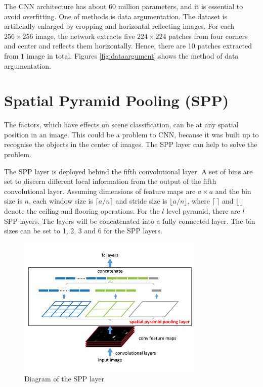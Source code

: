 The CNN architecture \citep{krizhevsky2012imagenet} has about 60 million parameters, and it is essential to avoid overfitting. One of methods is data argumentation. The dataset is artificially enlarged by cropping and horizontal reflecting images. For each $256\times256$ image, the network extracts five $224\times224$ patches from four corners and center and reflects them horizontally. Hence, there are 10 patches extracted from $1$ image in total. Figures \ref{fig:dataargument} shows the method of data argumentation.

\section{Spatial Pyramid Pooling (SPP)}

The factors, which have effects on scene classification, can be at any spatial position in an image. This could be a problem to CNN, because it was built up to recognise the objects in the center of images. The SPP layer can help to solve the problem.

The SPP layer is deployed behind the fifth convolutional layer. A set of bins are set to discern different local information from the output of the fifth convolutional layer. Assuming dimensions of feature maps are $a\times a$ and the bin size is $n$, each window size is $\lceil a/n \rceil$ and stride size is $\lfloor a/n \rfloor$, where $\lceil\,\rceil$ and $\lfloor\,\rfloor$ denote the ceiling and flooring operations. For the $l$ level pyramid, there are $l$ SPP layers. The layers will be concatenated into a fully connected layer. The bin sizes can be set to 1, 2, 3 and 6 for the SPP layers.

\begin{figure}[htb]
    \centering
	\includegraphics[width=0.8\textwidth]{sppnet.jpg}
    \caption{Diagram of the SPP layer \citep{he2014spatial}}%
    \label{fig:sppnet}%
\end{figure}

